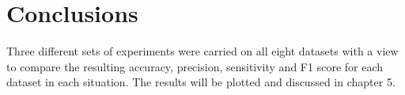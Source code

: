 \section{Conclusions}
Three different sets of experiments were carried on all eight datasets with a view to compare the resulting accuracy, precision, sensitivity and F1 score for each dataset in each situation. The results will be plotted and discussed in chapter 5.


